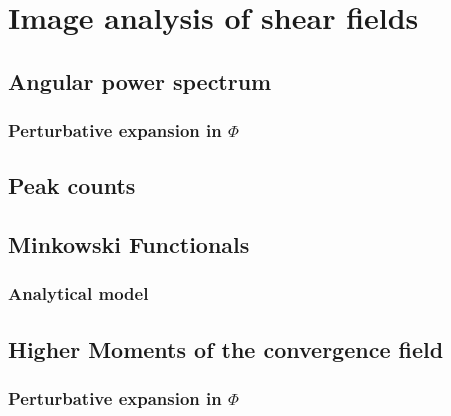 
\chapter{Image analysis of shear fields}
\lhead[\fancyplain{}{\thepage}]{\fancyplain{}{\rightmark}}
 \thispagestyle{plain}
\setlength{\parindent}{10mm}


\section{Angular power spectrum}

\subsection{Perturbative expansion in $\Phi$}

\section{Peak counts}

\section{Minkowski Functionals}

\subsection{Analytical model}

\section{Higher Moments of the convergence field}

\subsection{Perturbative expansion in $\Phi$}

